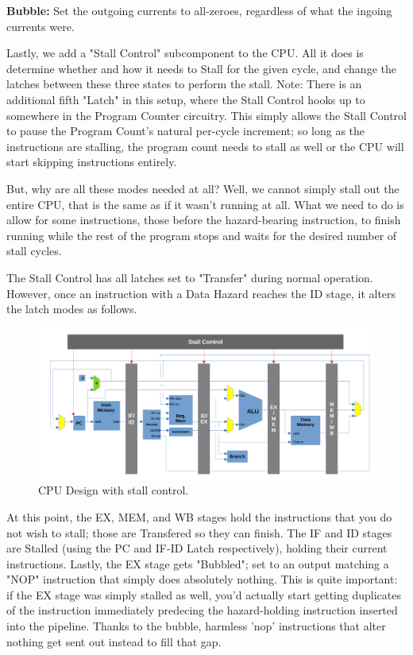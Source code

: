 \documentclass[12pt,twoside]{reedthesis}
\begin{document}
\qquad \textbf{Bubble:} Set the outgoing currents to all-zeroes, regardless of what the ingoing currents were.

Lastly, we add a "Stall Control" subcomponent to the CPU. All it does is determine whether and how it needs to Stall for the given cycle, and  change the latches between these three states to perform the stall. Note: There is an additional fifth "Latch" in this setup, where the Stall Control hooks up to somewhere in the Program Counter circuitry. This simply allows the Stall Control to pause the Program Count's natural per-cycle increment; so long as the instructions are stalling, the program count needs to stall as well or the CPU will start skipping instructions entirely.

But, why are all these modes needed at all? Well, we cannot simply stall out the entire CPU, that is the same as if it wasn't running at all. What we need to do is allow for some instructions, those before the hazard-bearing instruction, to finish running while the rest of the program stops and waits for the desired number of stall cycles.

The Stall Control has all latches set to "Transfer" during normal operation. However, once an instruction with a Data Hazard reaches the ID stage, it alters the latch modes as follows.

\begin{figure}[h!]

	\centering
	\includegraphics[scale=0.45]{cpu_stallctl}
	\caption{CPU Design with stall control.}
	\label{stall-ctl}
\end{figure}

At this point, the EX, MEM, and WB stages hold the instructions that you do not wish to stall; those are Transfered so they can finish. The IF and ID stages are Stalled (using the PC and IF-ID Latch respectively), holding their current instructions. Lastly, the EX stage gets "Bubbled"; set to an output matching a "NOP" instruction that simply does absolutely nothing. This is quite important: if the EX stage was simply stalled as well, you'd actually start getting duplicates of the instruction immediately predecing the hazard-holding instruction inserted into the pipeline. Thanks to the bubble, harmless 'nop' instructions that alter nothing get sent out instead to fill that gap.
\end{document}
